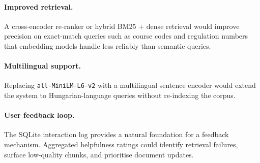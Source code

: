 \paragraph{Improved retrieval.}
A cross-encoder re-ranker or hybrid BM25 + dense retrieval would improve
precision on exact-match queries such as course codes and regulation numbers
that embedding models handle less reliably than semantic queries.

\paragraph{Multilingual support.}
Replacing \texttt{all-MiniLM-L6-v2} with a multilingual sentence encoder would
extend the system to Hungarian-language queries without re-indexing the corpus.

\paragraph{User feedback loop.}
The SQLite interaction log provides a natural foundation for a feedback
mechanism. Aggregated helpfulness ratings could identify retrieval failures,
surface low-quality chunks, and prioritise document updates.
